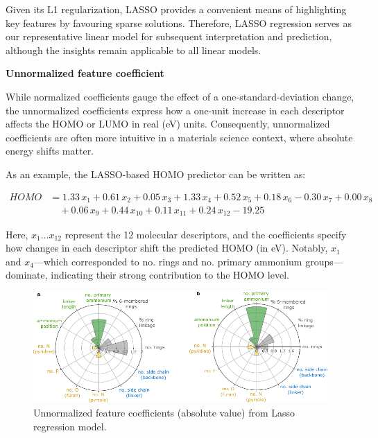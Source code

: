 Given its L1 regularization, LASSO provides a convenient means of highlighting key features by favouring sparse solutions. Therefore, LASSO regression serves as our representative linear model for subsequent interpretation and prediction, although the insights remain applicable to all linear models.

\textbf{Unnormalized feature coefficient}

While normalized coefficients gauge the effect of a one-standard-deviation change, the unnormalized coefficients express how a one-unit increase in each descriptor affects the HOMO or LUMO in real (eV) units. Consequently, unnormalized coefficients are often more intuitive in a materials science context, where absolute energy shifts matter.

As an example, the LASSO-based HOMO predictor can be written as:

\begin{equation}
\begin{split}
    HOMO &= 1.33\,x_1 + 0.61\,x_2 + 0.05\,x_3 + 1.33\,x_4 + 0.52\,x_5 + 0.18\,x_6 - 0.30\,x_7 + 0.00\,x_8 \\
         &\quad + 0.06\,x_9 + 0.44\,x_{10} + 0.11\,x_{11} + 0.24\,x_{12} - 19.25
\end{split}
\end{equation}


Here, $x_1…x_{12}$ represent the 12 molecular descriptors, and the coefficients specify how changes in each descriptor shift the predicted HOMO (in eV). Notably, $x_1$ and $x_4$—which corresponded to no. rings and no. primary ammonium groups—dominate, indicating their strong contribution to the HOMO level.

\begin{figure}[htbp]
    \centering
    \includegraphics[width=\textwidth]{figures/HT-ML/figure4-16.pdf}
    \caption{Unnormalized feature coefficients (absolute value) from Lasso regression model. }
    \label{fig:figure4.16}
\end{figure}

